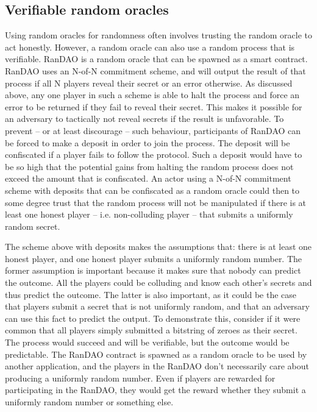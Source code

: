 \subsection{Verifiable random oracles}

Using random oracles for randomness often involves trusting the random oracle to act honestly. However, a random oracle can also use a random process that is verifiable. RanDAO \cite{randao2015randao} is a random oracle that can be spawned as a smart contract. RanDAO uses an N-of-N commitment scheme, and will output the result of that process if all N players reveal their secret or an error otherwise. As discussed above, any one player in such a scheme is able to halt the process and force an error to be returned if they fail to reveal their secret. This makes it possible for an adversary to tactically not reveal secrets if the result is unfavorable. To prevent – or at least discourage – such behaviour, participants of RanDAO can be forced to make a deposit in order to join the process. The deposit will be confiscated if a player fails to follow the protocol. Such a deposit would have to be so high that the potential gains from halting the random process does not exceed the amount that is confiscated. An actor using a N-of-N commitment scheme with deposits that can be confiscated as a random oracle could then to some degree trust that the random process will not be manipulated if there is at least one honest player – i.e. non-colluding player – that submits a uniformly random secret.

The scheme above with deposits makes the assumptions that: there is at least one honest player, and one honest player submits a uniformly random number. The former assumption is important because it makes sure that nobody can predict the outcome. All the players could be colluding and know each other's secrets and thus predict the outcome. The latter is also important, as it could be the case that players submit a secret that is not uniformly random, and that an adversary can use this fact to predict the output. To demonstrate this, consider if it were common that all players simply submitted a bitstring of zeroes as their secret. The process would succeed and will be verifiable, but the outcome would be predictable. The RanDAO contract is spawned as a random oracle to be used by another application, and the players in the RanDAO don't necessarily care about producing a uniformly random number. Even if players are rewarded for participating in the RanDAO, they would get the reward whether they submit a uniformly random number or something else.

